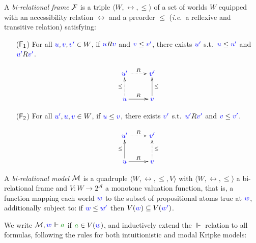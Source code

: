 \begin{definition}
	A \emph{bi-relational frame} $\mathcal{F}$ is a triple $\langle W, \rel, \le \rangle$ 
	of a set of worlds $W$ equipped with an {accessibility relation} $\rel$ and a preorder $\le$ (\emph{i.e.}\ a reflexive and transitive relation) satisfying:
	\begin{enumerate}
		\item[($\mathsf{F_1}$)] For all ${\color{blue}{u}}, {\color{blue}{v}}, {\color{blue}{v'}} \in W$, if ${\color{blue}{u}}R{\color{blue}{v}}$ and ${\color{blue}{v}}\le{{\color{blue}{v'}}}$, there exists ${\color{blue}{u'}}$ s.t.~${\color{blue}{u}}\le{{\color{blue}{u'}}}$ and ${\color{blue}{u'}}R{\color{blue}{v'}}$.
		
		\begin{equation*}
		\xymatrix{
			\lb{u'} \ar@{.>}[r]^R  & \lb{v'} \\
			\lb u \ar@{.>}[u]^{\le} \ar@{->}[r]^R  & \lb v \ar@{->}[u]_{\le}
		}
		\end{equation*}
		
		\item[($\mathsf{F_2}$)] For all ${\color{blue}{u'}}, {\color{blue}{u}}, {\color{blue}{v}} \in W$, if ${\color{blue}{u}}\le{{\color{blue}{v}}}$, there exists ${\color{blue}{v'}}$ s.t.~${\color{blue}{u'}}R{\color{blue}{v'}}$ and ${\color{blue}{v}}\le{{\color{blue}{v'}}}$.
		
		\begin{equation*}
		\xymatrix{
			\lb{u'} \ar@{.>}[r]^R & \lb{v'} \\
			\lb u \ar@{->}[u]^{\le} \ar@{->}[r]^R & \lb v \ar@{.>}[u]_{\le}
		}
		\end{equation*}
	\end{enumerate}
\end{definition}

\begin{definition}
	\label{model}
	A \emph{bi-relational model} $\mathcal{M}$ is a quadruple $\langle W, \rel,\le,V \rangle$ with $\langle W, \rel, \le \rangle$ a bi-relational frame and $V\colon W \to 2^\mathcal{A}$ a monotone valuation function, that is, a function mapping each world ${\color{blue}{w}}$ to the subset of propositional atoms true at ${\color{blue}{w}}$, additionally subject to:
	if ${\color{blue}{w}} \le {\color{blue}{w'}}$ then $V({\color{blue}{w}})\subseteq V({\color{blue}{w'}})$.
\end{definition}

We write $\M, \lb w \Vdash \fm a$ if $\fm a \in V(\lb w)$, and inductively extend the $\Vdash$ relation to all formulas, following the rules for both intuitionistic and modal Kripke models:

